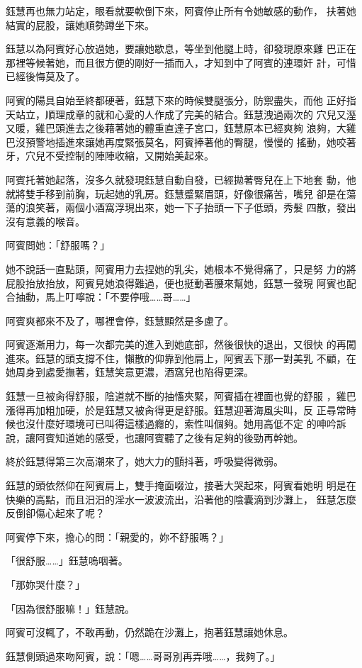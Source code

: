 鈺慧再也無力站定，眼看就要軟倒下來，阿賓停止所有令她敏感的動作，
扶著她結實的屁股，讓她順勢蹲坐下來。

鈺慧以為阿賓好心放過她，要讓她歇息，等坐到他腿上時，卻發現原來雞
巴正在那裡等候著她，而且很方便的剛好一插而入，才知到中了阿賓的連環奸
計，可惜已經後悔莫及了。

阿賓的陽具自始至終都硬著，鈺慧下來的時候雙腿張分，防禦盡失，而他
正好指天站立，順理成章的就和心愛的人作成了完美的結合。鈺慧洩過兩次的
穴兒又溼又暖，雞巴頭進去之後藉著她的體重直達子宮口，鈺慧原本已經爽夠
浪夠，大雞巴沒預警地插進來讓她再度緊張莫名，阿賓捧著他的臀腿，慢慢的
搖動，她咬著牙，穴兒不受控制的陣陣收縮，又開始美起來。

阿賓托著她起落，沒多久就發現鈺慧自動自發，已經拋著臀兒在上下地套
動，他就將雙手移到前胸，玩起她的乳房。鈺慧蹙緊眉頭，好像很痛苦，嘴兒
卻是在蕩蕩的浪笑著，兩個小酒窩浮現出來，她一下子抬頭一下子低頭，秀髮
四散，發出沒有意義的喉音。

阿賓問她：「舒服嗎？」

她不說話一直點頭，阿賓用力去捏她的乳尖，她根本不覺得痛了，只是努
力的將屁股抬放抬放，阿賓見她浪得難過，便也挺動著腰來幫她，鈺慧一發現
阿賓也配合抽動，馬上叮嚀說：「不要停哦……哥……」

阿賓爽都來不及了，哪裡會停，鈺慧顯然是多慮了。

阿賓逐漸用力，每一次都完美的進入到她底部，然後很快的退出，又很快
的再闖進來。鈺慧的頭支撐不住，懶散的仰靠到他肩上，阿賓丟下那一對美乳
不顧，在她周身到處愛撫著，鈺慧笑意更濃，酒窩兒也陷得更深。

鈺慧一旦被肏得舒服，陰道就不斷的抽慉夾緊，阿賓插在裡面也覺的舒服
，雞巴漲得再加粗加硬，於是鈺慧又被肏得更是舒服。鈺慧迎著海風尖叫，反
正尋常時候也沒什麼好環境可已叫得這樣過癮的，索性叫個夠。她用高低不定
的呻吟訴說，讓阿賓知道她的感受，也讓阿賓聽了之後有足夠的後勁再幹她。

終於鈺慧得第三次高潮來了，她大力的顫抖著，呼吸變得微弱。

鈺慧的頭依然仰在阿賓肩上，雙手掩面啜泣，接著大哭起來，阿賓看她明
明是在快樂的高點，而且汨汨的淫水一波波流出，沿著他的陰囊滴到沙灘上，
鈺慧怎麼反倒卻傷心起來了呢？

阿賓停下來，擔心的問：「親愛的，妳不舒服嗎？」

「很舒服……」鈺慧嗚咽著。

「那妳哭什麼？」

「因為很舒服嘛！」鈺慧說。

阿賓可沒輒了，不敢再動，仍然跪在沙灘上，抱著鈺慧讓她休息。

鈺慧側頭過來吻阿賓，說：「嗯……哥哥別再弄哦……，我夠了。」

